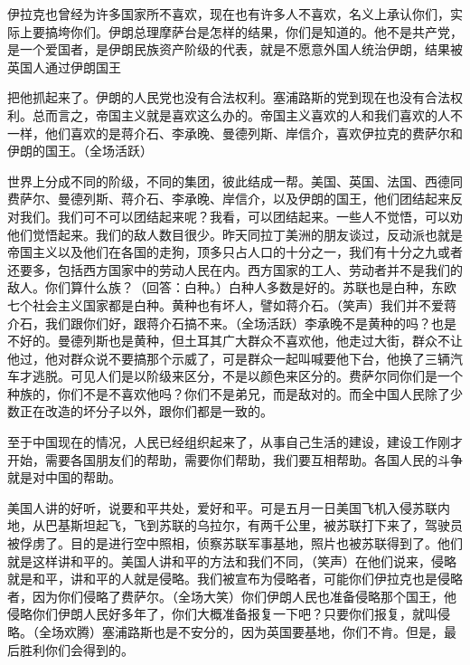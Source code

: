 伊拉克也曾经为许多国家所不喜欢，现在也有许多人不喜欢，名义上承认你们，实际上要搞垮你们。伊朗总理摩萨台是怎样的结果，你们是知道的。他不是共产党，是一个爱国者，是伊朗民族资产阶级的代表，就是不愿意外国人统治伊朗，结果被英国人通过伊朗国王

把他抓起来了。伊朗的人民党也没有合法权利。塞浦路斯的党到现在也没有合法权利。总而言之，帝国主义就是喜欢这么办的。帝国主义喜欢的人和我们喜欢的人不一样，他们喜欢的是蒋介石、李承晚、曼德列斯、岸信介，喜欢伊拉克的费萨尔和伊朗的国王。（全场活跃）

世界上分成不同的阶级，不同的集团，彼此结成一帮。美国、英国、法国、西德同费萨尔、曼德列斯、蒋介石、李承晚、岸信介，以及伊朗的国王，他们团结起来反对我们。我们可不可以团结起来呢？我看，可以团结起来。一些人不觉悟，可以劝他们觉悟起来。我们的敌人数目很少。昨天同拉丁美洲的朋友谈过，反动派也就是帝国主义以及他们在各国的走狗，顶多只占人口的十分之一，我们有十分之九或者还要多，包括西方国家中的劳动人民在内。西方国家的工人、劳动者并不是我们的敌人。你们算什么族？（回答：白种。）白种人多数是好的。苏联也是白种，东欧七个社会主义国家都是白种。黄种也有坏人，譬如蒋介石。（笑声）我们并不爱蒋介石，我们跟你们好，跟蒋介石搞不来。（全场活跃）李承晚不是黄种的吗？也是不好的。曼德列斯也是黄种，但土耳其广大群众不喜欢他，他走过大街，群众不让他过，他对群众说不要搞那个示威了，可是群众一起叫喊要他下台，他换了三辆汽车才逃脱。可见人们是以阶级来区分，不是以颜色来区分的。费萨尔同你们是一个种族的，你们不是不喜欢他吗？你们不是弟兄，而是敌对的。而全中国人民除了少数正在改造的坏分子以外，跟你们都是一致的。

至于中国现在的情况，人民已经组织起来了，从事自己生活的建设，建设工作刚才开始，需要各国朋友们的帮助，需要你们帮助，我们要互相帮助。各国人民的斗争就是对中国的帮助。

美国人讲的好听，说要和平共处，爱好和平。可是五月一日美国飞机入侵苏联内地，从巴基斯坦起飞，飞到苏联的乌拉尔，有两千公里，被苏联打下来了，驾驶员被俘虏了。目的是进行空中照相，侦察苏联军事基地，照片也被苏联得到了。他们就是这样讲和平的。美国人讲和平的方法和我们不同，（笑声）在他们说来，侵略就是和平，讲和平的人就是侵略。我们被宣布为侵略者，可能你们伊拉克也是侵略者，因为你们侵略了费萨尔。（全场大笑）你们伊朗人民也准备侵略那个国王，他侵略你们伊朗人民好多年了，你们大概准备报复一下吧？只要你们报复，就叫侵略。（全场欢腾）塞浦路斯也是不安分的，因为英国要基地，你们不肯。但是，最后胜利你们会得到的。

